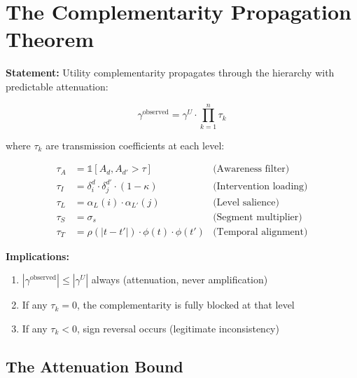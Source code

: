 \section{The Complementarity Propagation Theorem}
\label{sec:gtc-propagation}

\begin{tcolorbox}[colback=green!5!white, colframe=green!75!black,
    title=Theorem GTC-5: Complementarity Propagation]

\textbf{Statement:} Utility complementarity propagates through the hierarchy
with predictable attenuation:

\begin{equation}
\boxed{
\gamma^{\text{observed}} = \gamma^U \cdot \prod_{k=1}^{n} \tau_k
}
\end{equation}

where $\tau_k$ are transmission coefficients at each level:

\begin{align}
\tau_A &= \mathbb{1}[A_d, A_{d'} > \tau] & \text{(Awareness filter)} \\
\tau_I &= \delta_i^d \cdot \delta_j^{d'} \cdot (1 - \kappa) & \text{(Intervention loading)} \\
\tau_L &= \alpha_L(i) \cdot \alpha_{L'}(j) & \text{(Level salience)} \\
\tau_S &= \sigma_s & \text{(Segment multiplier)} \\
\tau_T &= \rho(|t-t'|) \cdot \phi(t) \cdot \phi(t') & \text{(Temporal alignment)}
\end{align}

\textbf{Implications:}
\begin{enumerate}
    \item $|\gamma^{\text{observed}}| \leq |\gamma^U|$ always (attenuation, never amplification)
    \item If any $\tau_k = 0$, the complementarity is fully blocked at that level
    \item If any $\tau_k < 0$, sign reversal occurs (legitimate inconsistency)
\end{enumerate}

\end{tcolorbox}

\subsection{The Attenuation Bound}

